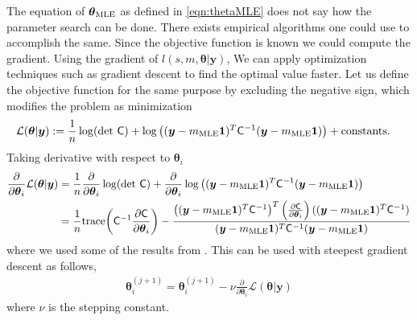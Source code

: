 \documentclass{iitthesis}          %
\newcommand{\bm}[1]{\boldsymbol{#1}}
\newcommand{\trace}[1]{\textup{trace}{#1}}
\newcommand{\vtheta}{{\bm{\theta}}}
\newcommand{\vy}{\bm{y}}
\newcommand{\vone}{\bm{1}}
\newcommand{\mC}{\mathsf{C}}
\newcommand{\mCInv}{{\mathsf{C}^{-1}}}
\newcommand{\MLE}{\textup{MLE}}
\begin{document}
 \label{grad_descent_MLE}
The equation of $\vtheta_\MLE$ as defined in \eqref{eqn:thetaMLE} does not say how the parameter search can be done. There exists empirical algorithms \cite{Bre73} \cite{For77} one could use to accomplish the same.
Since the objective function is known we could compute the gradient.
Using the gradient of $l(s,m,\vtheta | \vy)$, We can apply optimization techniques such as gradient descent to find the optimal value faster. Let us define the objective function for the same purpose by excluding the negative sign, which modifies the problem as minimization
\begin{align*}
\mathcal{L}(\vtheta | \vy)
&:= \frac{1}{n} \log(\det\, \mC) +  \log\left( (\vy-m_\MLE\vone)^T\mCInv(\vy-m_\MLE\vone) \right) + \text{constants.}
\end{align*}
Taking derivative with respect to $\vtheta_i$
\begin{align*}
\frac{\partial}{\partial \vtheta_i} \mathcal{L}(\vtheta | \vy)
&=  \frac{1}{n} \frac{\partial}{\partial \vtheta_i} \log(\det\, \mC) + \frac{\partial}{\partial \vtheta_i} 
\log\left((\vy-m_\MLE\vone)^T\mCInv(\vy-m_\MLE\vone) \right)
\\
&= \frac 1n \trace{\left( \mCInv \frac{\partial \mC}{\partial \vtheta_i} \right)}
- 
\frac
{\left((\vy-m_\MLE\vone)^T\mCInv\right)^T 
	\left( \frac{\partial \mC}{\partial \vtheta_i} \right)
	((\vy-m_\MLE\vone)^T\mCInv)}
{(\vy-m_\MLE\vone)^T\mCInv(\vy-m_\MLE\vone)}
\end{align*}
where we used some of the results from \cite{Dong2017a}. 
This can be used with steepest gradient descent as follows,
\begin{align}
\label{eqn:deep_descent}
\vtheta_i^{(j+1)} = \vtheta_i^{(j+1)} - \nu \frac{\partial}{\partial \vtheta_i} \mathcal{L}(\vtheta | \vy)
\end{align}
where $\nu$ is the stepping constant. 
\end{document}
